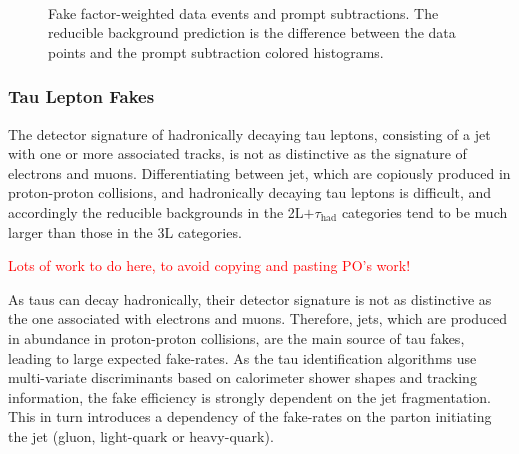 \begin{figure}[h]
{	} \\
	\caption{Fake factor-weighted data events and prompt subtractions. The reducible background prediction is the difference between the data points and the prompt subtraction colored histograms.}
	\label{fig:prompt-subtractions}
\end{figure}

\subsubsection{Tau Lepton Fakes}\label{sec:model-independent-ff-tau}
The detector signature of hadronically decaying tau leptons, consisting of a jet with one or more associated tracks, is not as distinctive as the signature of electrons and muons. Differentiating between jet, which are copiously produced in proton-proton collisions, and hadronically decaying tau leptons is difficult, and accordingly the reducible backgrounds in the 2L$+\tau_{\mathrm{had}}$ categories tend to be much larger than those in the 3L categories. 

\textcolor{red}{Lots of work to do here, to avoid copying and pasting PO's work!}

As taus can decay hadronically, their detector signature is not as distinctive as the one
associated with electrons and muons.  Therefore, jets, which are produced in abundance in
proton-proton collisions, are the main source of tau fakes, leading to large expected
fake-rates.  As the tau identification algorithms use multi-variate discriminants based on
calorimeter shower shapes and tracking information, the fake efficiency is strongly
dependent on the jet fragmentation. This in turn introduces a dependency of the fake-rates
on the parton initiating the jet (gluon, light-quark or heavy-quark).

